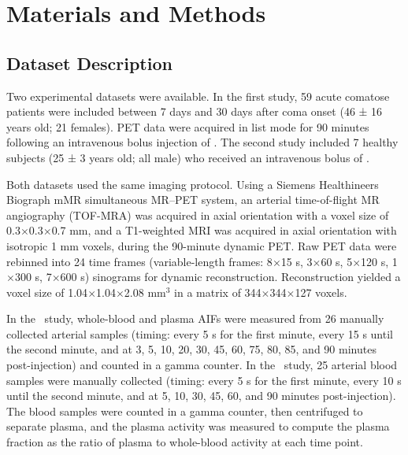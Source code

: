 \chapter{Materials and Methods}

\section{Dataset Description}
Two experimental datasets were available.
In the first study, 59 acute comatose patients were included between 7 days and 30 days after coma onset (46 ± 16 years old; 21 females).
PET data were acquired in list mode for 90 minutes following an intravenous bolus injection of \fdg.
The second study included 7 healthy subjects (25 ± 3 years old; all male) who received an intravenous bolus of \yohimbine.

Both datasets used the same imaging protocol.
Using a Siemens Healthineers Biograph mMR simultaneous MR–PET system, an arterial time-of-flight MR angiography (TOF-MRA) was acquired in axial orientation with a voxel size of 0.3\(\times\)0.3\(\times\)0.7 mm, and a T1-weighted MRI was acquired in axial orientation with isotropic 1 mm voxels, during the 90-minute dynamic PET.
Raw PET data were rebinned into 24 time frames (variable-length frames: 8\(\times\)15 s, 3\(\times\)60 s, 5\(\times\)120 s, 1\(\times\)300 s, 7\(\times\)600 s) sinograms for dynamic reconstruction.
Reconstruction yielded a voxel size of 1.04\(\times\)1.04\(\times\)2.08 mm\(^3\) in a matrix of 344\(\times\)344\(\times\)127 voxels.

In the \fdg\ study, whole-blood and plasma AIFs were measured from 26 manually collected arterial samples (timing: every 5 s for the first minute, every 15 s until the second minute, and at 3, 5, 10, 20, 30, 45, 60, 75, 80, 85, and 90 minutes post-injection) and counted in a gamma counter.
In the \yohimbine\ study, 25 arterial blood samples were manually collected (timing: every 5 s for the first minute, every 10 s until the second minute, and at 5, 10, 30, 45, 60, and 90 minutes post-injection).
The blood samples were counted in a gamma counter, then centrifuged to separate plasma, and the plasma activity was measured to compute the plasma fraction as the ratio of plasma to whole-blood activity at each time point.

